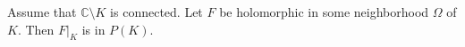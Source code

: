 
Assume that $\mathbb{C}\setminus K$ is connected. Let $F$ be holomorphic in some neighborhood $\Omega$ of $K$. Then $F|_K$ is in $P(K)$.
